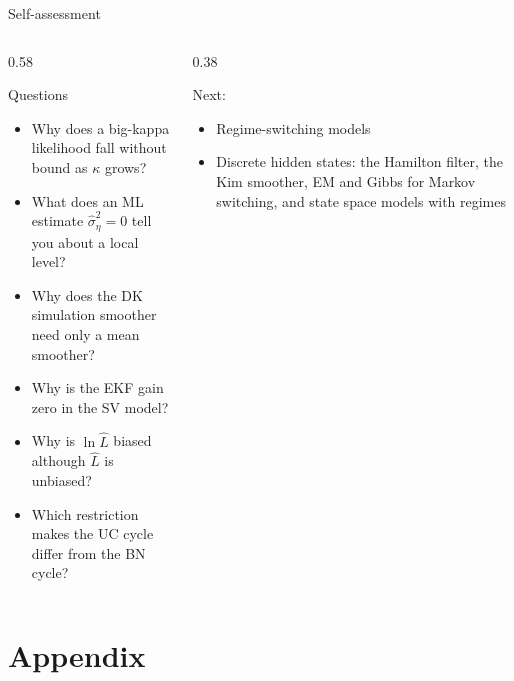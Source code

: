 \begin{frame}{Self-assessment}
\itemsize{\small}
\begin{columns}[T]
\begin{column}{0.58\textwidth}
\begin{block}{Questions}
\begin{itemize}
    \item Why does a big-kappa likelihood fall without bound as $\kappa$ grows?
    \item What does an ML estimate $\hat\sigma^2_\eta = 0$ tell you about a local level?
    \item Why does the DK simulation smoother need only a mean smoother?
    \item Why is the EKF gain zero in the SV model?
    \item Why is $\ln\hat L$ biased although $\hat L$ is unbiased?
    \item Which restriction makes the UC cycle differ from the BN cycle?
\end{itemize}
\end{block}
\end{column}
\begin{column}{0.38\textwidth}
\begin{block}{Next: }
\begin{itemize}
    \item Regime-switching models
    \item Discrete hidden states: the Hamilton filter, the Kim smoother, EM and Gibbs for Markov switching, and state space models with regimes
\end{itemize}
\end{block}
\end{column}
\end{columns}
\end{frame}


\section{Appendix}

